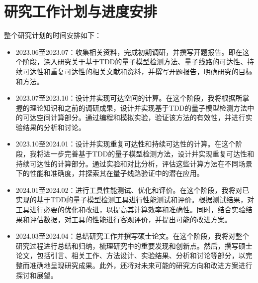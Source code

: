 \section{研究工作计划与进度安排}
整个研究计划的时间安排如下：
\begin{itemize}
    \item 2023.06至2023.07：收集相关资料，完成初期调研，并撰写开题报告。即在这个阶段，深入研究关于基于TDD的量子模型检测方法、量子线路的可达性、持续可达性和重复可达性的相关文献和资料，并撰写开题报告，明确研究的目标和方法。
    \item 2023.07至2023.10：设计并实现可达空间的计算。在这个阶段，我将根据所掌握的理论知识和之前的调研成果，设计并实现基于TDD的量子模型检测方法中的可达空间计算部分。通过编程和模拟实验，验证该方法的有效性，并进行实验结果的分析和讨论。
    \item 2023.10至2024.01：设计并实现重复可达性和持续可达性的计算。在这个阶段，我将进一步完善基于TDD的量子模型检测方法，设计并实现重复可达性和持续可达性的计算部分。通过实验和对比分析，评估这些计算方法在不同场景下的性能和准确度，并探索其在量子线路验证中的潜在应用。
    \item 2024.01至2024.02：进行工具性能测试、优化和评价。在这个阶段，我将对已实现的基于TDD的量子模型检测工具进行性能测试和评价。根据测试结果，对工具进行必要的优化和改进，以提高其计算效率和准确性。同时，结合实验结果和评估数据，对工具的性能进行客观评价，并提出可能的改进方案。
    \item 2024.03至2024.04：总结研究工作并撰写硕士论文。在这个阶段，我将对整个研究过程进行总结和归纳，梳理研究中的重要发现和创新点。然后，撰写硕士论文，包括引言、相关工作、方法设计、实验结果、分析和讨论等部分，以完整而准确地呈现研究成果。此外，还将对未来可能的研究方向和改进方案进行探讨和展望。
\end{itemize}


